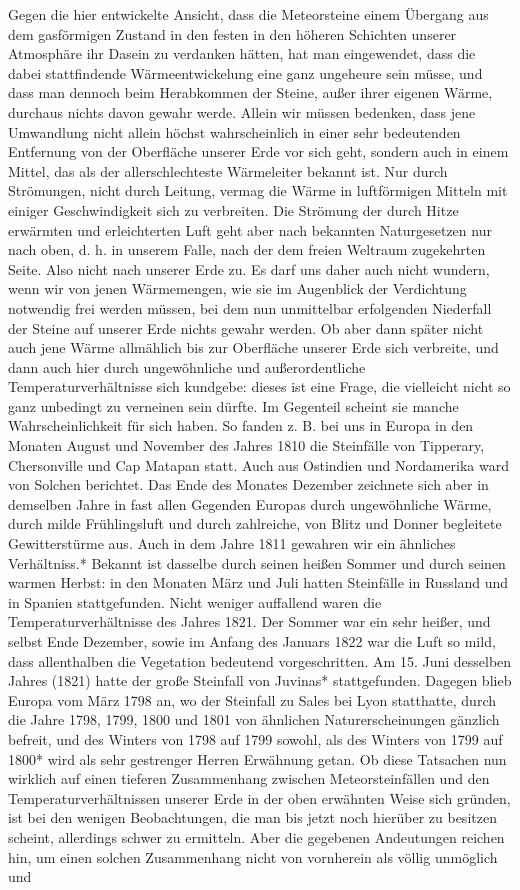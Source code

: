\documentclass[a4paper, 11pt, oneside, polutonikogreek, german]{article}
\begin{document}
Gegen die hier entwickelte Ansicht, dass die Meteorsteine einem Übergang aus dem gasförmigen Zustand in den festen in den höheren Schichten unserer Atmosphäre ihr Dasein zu verdanken hätten, hat man eingewendet, dass die dabei stattfindende Wärmeentwickelung eine ganz ungeheure sein müsse, und dass man dennoch beim Herabkommen der Steine, außer ihrer eigenen Wärme, durchaus nichts davon gewahr werde. Allein wir müssen bedenken, dass jene Umwandlung nicht allein höchst wahrscheinlich in einer sehr bedeutenden Entfernung von der Oberfläche unserer Erde vor sich geht, sondern auch in einem Mittel, das als der allerschlechteste Wärmeleiter bekannt ist. Nur durch Strömungen, nicht durch Leitung, vermag die Wärme in luftförmigen Mitteln mit einiger Geschwindigkeit sich zu verbreiten. Die Strömung der durch Hitze erwärmten und erleichterten Luft geht aber nach bekannten Naturgesetzen nur nach oben, d. h. in unserem Falle, nach der dem freien Weltraum zugekehrten Seite. Also nicht nach unserer Erde zu. Es darf uns daher auch nicht wundern, wenn wir von jenen Wärmemengen, wie sie im Augenblick der Verdichtung notwendig frei werden müssen, bei dem nun unmittelbar erfolgenden Niederfall der Steine auf unserer Erde nichts gewahr werden. Ob aber dann später nicht auch jene Wärme allmählich bis zur Oberfläche unserer Erde sich verbreite, und dann auch hier durch ungewöhnliche und außerordentliche Temperaturverhältnisse sich kundgebe: dieses ist eine Frage, die vielleicht nicht so ganz unbedingt zu verneinen sein dürfte. Im Gegenteil scheint sie manche Wahrscheinlichkeit für sich haben. So fanden z. B. bei uns in Europa in den Monaten August und November des Jahres 1810 die Steinfälle von Tipperary, Chersonville und Cap Matapan statt. Auch aus Ostindien und Nordamerika ward von Solchen berichtet. Das Ende des Monates Dezember zeichnete sich aber in demselben Jahre in fast allen Gegenden Europas durch ungewöhnliche Wärme, durch milde Frühlingsluft und durch zahlreiche, von Blitz und Donner begleitete Gewitterstürme aus. Auch in dem Jahre 1811 gewahren wir ein ähnliches Verhältniss.* Bekannt ist dasselbe durch seinen heißen Sommer und durch seinen warmen Herbst: in den Monaten März und Juli hatten Steinfälle in Russland und in Spanien stattgefunden. Nicht weniger auffallend waren die Temperaturverhältnisse des Jahres 1821. Der Sommer war ein sehr heißer, und selbst Ende Dezember, sowie im Anfang des Januars 1822 war die Luft so mild, dass allenthalben die Vegetation bedeutend vorgeschritten. Am 15. Juni desselben Jahres (1821) hatte der große Steinfall von Juvinas* stattgefunden. Dagegen blieb Europa vom März 1798 an, wo der Steinfall zu Sales bei Lyon statthatte, durch die Jahre 1798, 1799, 1800 und 1801 von ähnlichen Naturerscheinungen gänzlich befreit, und des Winters von 1798 auf 1799 sowohl, als des Winters von 1799 auf 1800* wird als sehr gestrenger Herren Erwähnung getan. Ob diese Tatsachen nun wirklich auf einen tieferen Zusammenhang zwischen Meteorsteinfällen und den Temperaturverhältnissen unserer Erde in der oben erwähnten Weise sich gründen, ist bei den wenigen Beobachtungen, die man bis jetzt noch hierüber zu besitzen scheint, allerdings schwer zu ermitteln. Aber die gegebenen Andeutungen reichen hin, um einen solchen Zusammenhang nicht von vornherein als völlig unmöglich und 
\end{document}
